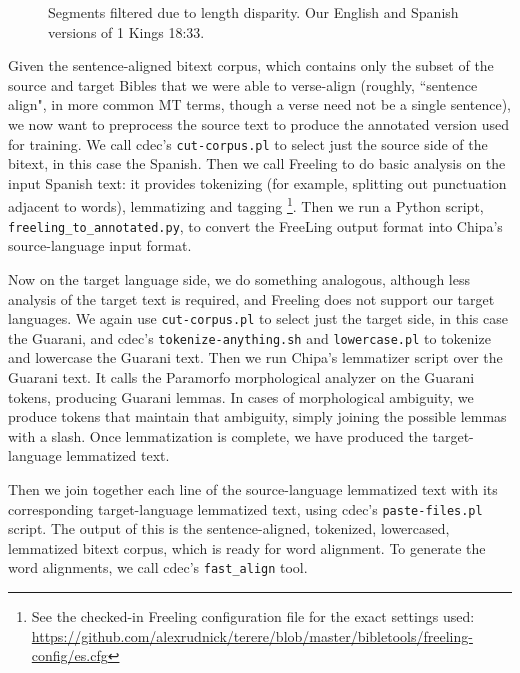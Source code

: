 \begin{figure}
\label{sent:wood-en}
\label{sent:wood-es}
  \caption{Segments filtered due to length disparity. Our English and Spanish
  versions of 1 Kings 18:33.}
  \label{fig:length-disparity}
\end{figure}

Given the sentence-aligned bitext corpus, which contains only the subset of the
source and target Bibles that we were able to verse-align (roughly, ``sentence
align", in more common MT terms, though a verse need not be a single sentence),
we now want to preprocess the source text to produce the annotated version used
for training. We call cdec's \texttt{cut-corpus.pl} to select just the source
side of the bitext, in this case the Spanish. Then we call Freeling to do basic
analysis on the input Spanish text: it provides tokenizing (for example,
splitting out punctuation adjacent to words), lemmatizing and tagging
\footnote{See the checked-in Freeling configuration file for the exact settings
used:
\url{https://github.com/alexrudnick/terere/blob/master/bibletools/freeling-config/es.cfg}}.
Then we run a Python script, \texttt{freeling\_to\_annotated.py}, to convert
the FreeLing output format into Chipa's source-language input format.

Now on the target language side, we do something analogous, although less
analysis of the target text is required, and Freeling does not support our
target languages. We again use \texttt{cut-corpus.pl} to select just the target
side, in this case the Guarani, and cdec's \texttt{tokenize-anything.sh} and
\texttt{lowercase.pl} to tokenize and lowercase the Guarani text. Then we run
Chipa's lemmatizer script over the Guarani text. It calls the Paramorfo
morphological analyzer on the Guarani tokens, producing Guarani lemmas. In
cases of morphological ambiguity, we produce tokens that maintain that
ambiguity, simply joining the possible lemmas with a slash.  Once lemmatization
is complete, we have produced the target-language lemmatized text.

Then we join together each line of the source-language lemmatized text with its
corresponding target-language lemmatized text, using cdec's
\texttt{paste-files.pl} script. The output of this is the sentence-aligned,
tokenized, lowercased, lemmatized bitext corpus, which is ready for word
alignment. To generate the word alignments, we call cdec's \texttt{fast\_align}
tool.

